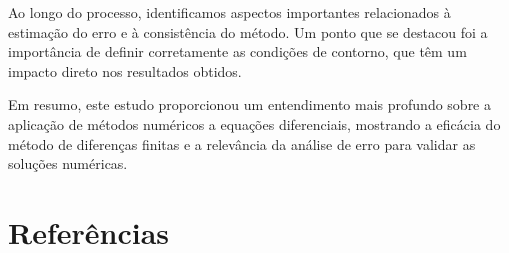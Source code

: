 \documentclass[column,amsmath,amssymb,floatfix]{revtex4}
\begin{document}
         Ao longo do processo, identificamos aspectos importantes relacionados à estimação do erro e à consistência do método. Um ponto que se destacou foi a importância de definir corretamente as condições de contorno, que têm um impacto direto nos resultados obtidos.
        
        Em resumo, este estudo proporcionou um entendimento mais profundo sobre a aplicação de métodos numéricos a equações diferenciais, mostrando a eficácia do método de diferenças finitas e a relevância da análise de erro para validar as soluções numéricas.
        
    
    \renewcommand{\bibsection}{}
    
    \section{Referências}
        \nocite{*}
        
        
        
\end{document}
